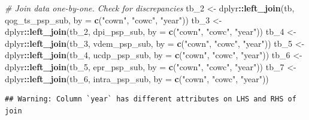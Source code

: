 \documentclass[
]{article}
\newenvironment{Shaded}{\begin{snugshade}}{\end{snugshade}}
\newcommand{\CommentTok}[1]{\textcolor[rgb]{0.56,0.35,0.01}{\textit{#1}}}
\newcommand{\DataTypeTok}[1]{\textcolor[rgb]{0.13,0.29,0.53}{#1}}
\newcommand{\DecValTok}[1]{\textcolor[rgb]{0.00,0.00,0.81}{#1}}
\newcommand{\KeywordTok}[1]{\textcolor[rgb]{0.13,0.29,0.53}{\textbf{#1}}}
\newcommand{\NormalTok}[1]{#1}
\newcommand{\OperatorTok}[1]{\textcolor[rgb]{0.81,0.36,0.00}{\textbf{#1}}}
\newcommand{\StringTok}[1]{\textcolor[rgb]{0.31,0.60,0.02}{#1}}
\begin{document}
\begin{Shaded}
\begin{Highlighting}[]
\CommentTok{# Join data one-by-one. Check for discrepancies}
\NormalTok{tb_}\DecValTok{2}\NormalTok{ <-}\StringTok{ }\NormalTok{dplyr}\OperatorTok{::}\KeywordTok{left_join}\NormalTok{(tb, qog_ts_psp_sub, }\DataTypeTok{by =} \KeywordTok{c}\NormalTok{(}\StringTok{"cown"}\NormalTok{, }\StringTok{"cowc"}\NormalTok{, }\StringTok{"year"}\NormalTok{))}
\NormalTok{tb_}\DecValTok{3}\NormalTok{ <-}\StringTok{ }\NormalTok{dplyr}\OperatorTok{::}\KeywordTok{left_join}\NormalTok{(tb_}\DecValTok{2}\NormalTok{, dpi_psp_sub, }\DataTypeTok{by =} \KeywordTok{c}\NormalTok{(}\StringTok{"cown"}\NormalTok{, }\StringTok{"cowc"}\NormalTok{, }\StringTok{"year"}\NormalTok{))}
\NormalTok{tb_}\DecValTok{4}\NormalTok{ <-}\StringTok{ }\NormalTok{dplyr}\OperatorTok{::}\KeywordTok{left_join}\NormalTok{(tb_}\DecValTok{3}\NormalTok{, vdem_psp_sub, }\DataTypeTok{by =} \KeywordTok{c}\NormalTok{(}\StringTok{"cown"}\NormalTok{, }\StringTok{"cowc"}\NormalTok{, }\StringTok{"year"}\NormalTok{))}
\NormalTok{tb_}\DecValTok{5}\NormalTok{ <-}\StringTok{ }\NormalTok{dplyr}\OperatorTok{::}\KeywordTok{left_join}\NormalTok{(tb_}\DecValTok{4}\NormalTok{, ucdp_psp_sub, }\DataTypeTok{by =} \KeywordTok{c}\NormalTok{(}\StringTok{"cown"}\NormalTok{, }\StringTok{"cowc"}\NormalTok{, }\StringTok{"year"}\NormalTok{))}
\NormalTok{tb_}\DecValTok{6}\NormalTok{ <-}\StringTok{ }\NormalTok{dplyr}\OperatorTok{::}\KeywordTok{left_join}\NormalTok{(tb_}\DecValTok{5}\NormalTok{, epr_psp_sub, }\DataTypeTok{by =} \KeywordTok{c}\NormalTok{(}\StringTok{"cown"}\NormalTok{, }\StringTok{"cowc"}\NormalTok{, }\StringTok{"year"}\NormalTok{))}
\NormalTok{tb_}\DecValTok{7}\NormalTok{ <-}\StringTok{ }\NormalTok{dplyr}\OperatorTok{::}\KeywordTok{left_join}\NormalTok{(tb_}\DecValTok{6}\NormalTok{, intra_psp_sub, }\DataTypeTok{by =} \KeywordTok{c}\NormalTok{(}\StringTok{"cown"}\NormalTok{, }\StringTok{"cowc"}\NormalTok{, }\StringTok{"year"}\NormalTok{))}
\end{Highlighting}
\end{Shaded}

\begin{verbatim}
## Warning: Column `year` has different attributes on LHS and RHS of join
\end{verbatim}
\end{document}
